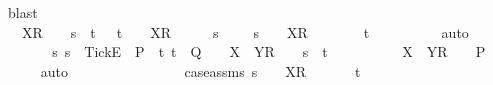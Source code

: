 \begin{isabellebody}
\ blast\isanewline
\ \ \ \ \ \ \ \ \isamarkupfalse%
\isanewline
\ \ \ \ \ \ \isamarkupfalse%
\isanewline
\ \ \ \ \ \ \isamarkupfalse%
\ \isamarkupfalse%
\ {\isachardoublequoteopen}{\isasymrho}\ {\isacharat}\ {\isacharbrackleft}X{\isacharbrackright}\isactrlsub R\ {\isacharhash}\ {\isasymsigma}\ {\isacharequal}\ s\ {\isacharat}\ t\ {\isasymLongrightarrow}\ {\isasymforall}{\isasymrho}{\isacharprime}{\isachardot}\ t\ {\isacharequal}\ {\isasymrho}{\isacharprime}\ {\isacharat}\ {\isacharbrackleft}X{\isacharbrackright}\isactrlsub R\ {\isacharhash}\ {\isasymsigma}\ {\isasymlongrightarrow}\ {\isasymrho}\ {\isasymnoteq}\ s\ {\isacharat}\ {\isasymrho}{\isacharprime}\ {\isasymLongrightarrow}\ {\isasymexists}{\isasymsigma}{\isacharprime}{\isachardot}\ s\ {\isacharequal}\ {\isasymrho}\ {\isacharat}\ {\isacharbrackleft}X{\isacharbrackright}\isactrlsub R\ {\isacharhash}\ {\isasymsigma}{\isacharprime}\ {\isasymand}\ {\isasymsigma}\ {\isacharequal}\ {\isasymsigma}{\isacharprime}\ {\isacharat}\ t{\isachardoublequoteclose}\isanewline
\ \ \ \ \ \ \ \ \isamarkupfalse%
\ auto\isanewline
\ \ \ \ \isamarkupfalse%
\isanewline
\ \ \ \ \isamarkupfalse%
\ \isamarkupfalse%
\ {\isachardoublequoteopen}{\isasymforall}s{\isachardot}\ s\ {\isacharat}\ {\isacharbrackleft}{\isacharbrackleft}Tick{\isacharbrackright}\isactrlsub E{\isacharbrackright}\ {\isasymin}\ P\ {\isasymlongrightarrow}\ {\isacharparenleft}{\isasymforall}t{\isachardot}\ t\ {\isasymin}\ Q\ {\isasymlongrightarrow}\ {\isasymrho}\ {\isacharat}\ {\isacharbrackleft}X\ {\isasymunion}\ Y{\isacharbrackright}\isactrlsub R\ {\isacharhash}\ {\isasymsigma}\ {\isasymnoteq}\ s\ {\isacharat}\ t{\isacharparenright}\ {\isasymLongrightarrow}\ \isanewline
\ \ \ \ \ \ {\isasymrho}\ {\isacharat}\ {\isacharbrackleft}X\ {\isasymunion}\ Y{\isacharbrackright}\isactrlsub R\ {\isacharhash}\ {\isasymsigma}\ {\isasymin}\ P{\isachardoublequoteclose}\isanewline
\ \ \ \ \isamarkupfalse%
\ auto\isanewline
\ \ \ \ \ \ \isamarkupfalse%
\ {\isasymsigma}{\isacharprime}\isanewline
\ \ \ \ \ \ \isamarkupfalse%
\ case{\isacharunderscore}assms{}{\isacharcolon}\ {\isachardoublequoteopen}s\ {\isacharequal}\ {\isasymrho}\ {\isacharat}\ {\isacharbrackleft}X{\isacharbrackright}\isactrlsub R\ {\isacharhash}\ {\isasymsigma}{\isacharprime}{\isachardoublequoteclose}\ {\isachardoublequoteopen}{\isasymsigma}\ {\isacharequal}\ {\isasymsigma}{\isacharprime}\ {\isacharat}\ t{\isachardoublequoteclose}\isanewline

\end{isabellebody}
